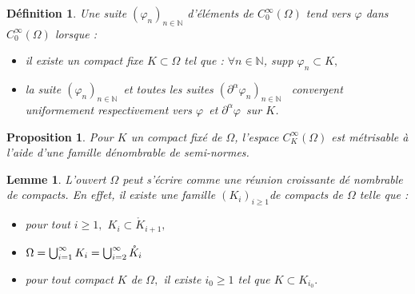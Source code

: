 \documentclass[3pt]{article}
\newtheorem{definition}[theorem]{D\'{e}finition}
\newtheorem{lemma}[theorem]{Lemme}
\newtheorem{proposition}[theorem]{Proposition}
\begin{document}
\bigskip

\begin{definition}
Une suite $\left( \varphi _{n}\right) _{n\in \mathbb{N}}$ d'\'{e}l\'{e}ments
de $C_{0}^{\infty }(\Omega )$ tend vers $\varphi $ dans $C_{0}^{\infty
}(\Omega )$ lorsque :

\begin{itemize}
\item il existe un compact fixe $K\subset \Omega $ tel que : $\forall n\in 
\mathbb{N}$, supp $\varphi _{n}\subset K,$

\item la suite $\left( \varphi _{n}\right) _{n\in \mathbb{N}}$\ et toutes
les suites $\left( \partial ^{\alpha }\varphi _{n}\right) _{n\in \mathbb{N}}$%
\ convergent uniformement respectivement vers $\varphi $\ et $\partial
^{\alpha }\varphi $\ sur $K$.
\end{itemize}
\end{definition}

\bigskip 

\begin{proposition}
Pour $K$ un compact fix\'{e} de $\Omega $, l'espace $C_{K}^{\infty }(\Omega )
$ est m\'{e}trisable \`{a} l'aide d'une famille d\'{e}nombrable de
semi-normes.
\end{proposition}

\bigskip 

\begin{lemma}
L'ouvert $\Omega $ peut s'\'{e}crire comme une r\'{e}union croissante d\'{e}%
nombrable de compacts. En effet, il existe une famille $(K_{i})_{i\geq 1}$de
compacts de $\Omega $ telle que :

\begin{itemize}
\item pour tout $i\geq 1,$ $K_{i}\subset \mathring{K}_{i+1},$

\item $\Omega =\bigcup_{i=1}^{\infty }K_{i}=\bigcup_{i=2}^{\infty }\mathring{%
K}_{i}$

\item pour tout compact $K$ de $\Omega ,$ il existe $i_{0}\geq 1$ tel que $%
K\subset K_{i_{0}}.$
\end{itemize}
\end{lemma}

\bigskip 
\end{document}
